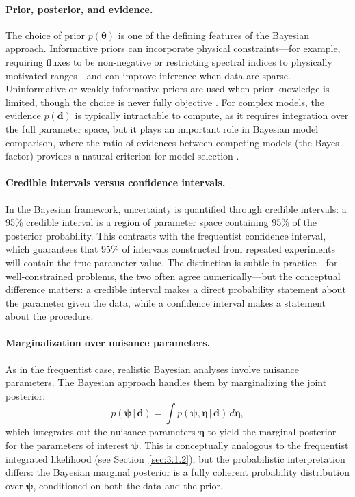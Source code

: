 \paragraph{Prior, posterior, and evidence.}

The choice of prior $p(\boldsymbol{\theta})$ is one of the defining features of the Bayesian approach.
Informative priors can incorporate physical constraints---for example, requiring fluxes to be non-negative or restricting spectral indices to physically motivated ranges---and can improve inference when data are sparse.
Uninformative or weakly informative priors are used when prior knowledge is limited, though the choice is never fully objective \cite{Hastie:2009}.
For complex models, the evidence $p(\mathbf{d})$ is typically intractable to compute, as it requires integration over the full parameter space, but it plays an important role in Bayesian model comparison, where the ratio of evidences between competing models (the Bayes factor) provides a natural criterion for model selection \cite{Kass:1995}.

\paragraph{Credible intervals versus confidence intervals.}

In the Bayesian framework, uncertainty is quantified through credible intervals: a 95\% credible interval is a region of parameter space containing 95\% of the posterior probability.
This contrasts with the frequentist confidence interval, which guarantees that 95\% of intervals constructed from repeated experiments will contain the true parameter value.
The distinction is subtle in practice---for well-constrained problems, the two often agree numerically---but the conceptual difference matters: a credible interval makes a direct probability statement about the parameter given the data, while a confidence interval makes a statement about the procedure.

\paragraph{Marginalization over nuisance parameters.}

As in the frequentist case, realistic Bayesian analyses involve nuisance parameters.
The Bayesian approach handles them by marginalizing the joint posterior:
\begin{equation}
	p(\boldsymbol{\psi} \,|\, \mathbf{d}) = \int p(\boldsymbol{\psi}, \boldsymbol{\eta} \,|\, \mathbf{d}) \, d\boldsymbol{\eta},
	\label{eq:bayesian_marginalization}
\end{equation}
which integrates out the nuisance parameters $\boldsymbol{\eta}$ to yield the marginal posterior for the parameters of interest $\boldsymbol{\psi}$.
This is conceptually analogous to the frequentist integrated likelihood (see Section~\ref{sec:3.1.2}), but the probabilistic interpretation differs: the Bayesian marginal posterior is a fully coherent probability distribution over $\boldsymbol{\psi}$, conditioned on both the data and the prior.


